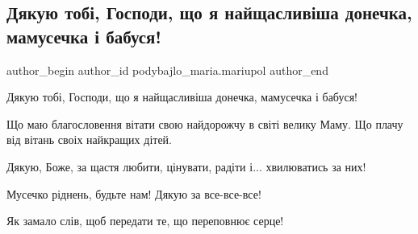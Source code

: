  
 
 
 
 

\subsection{Дякую тобі, Господи, що я найщасливіша донечка, мамусечка і бабуся!}
\label{sec:14_05_2023.fb.podybajlo_maria.mariupol.1.djakuju_tobi_gospody_donechka_mamusechka_babusja}

\ifcmt
 author_begin
   author_id podybajlo_maria.mariupol
 author_end
\fi

Дякую тобі, Господи, що я найщасливіша донечка, мамусечка і бабуся! 

Що маю благословення вітати свою найдорожчу в світі велику Маму. Що плачу від
вітань своіх найкращих дітей. 

Дякую, Боже, за щастя любити, цінувати, радіти і... хвилюватись за них!

Мусечко ріднень, будьте нам! Дякую за все-все-все!

Як замало слів, щоб передати те, що переповнює серце!
